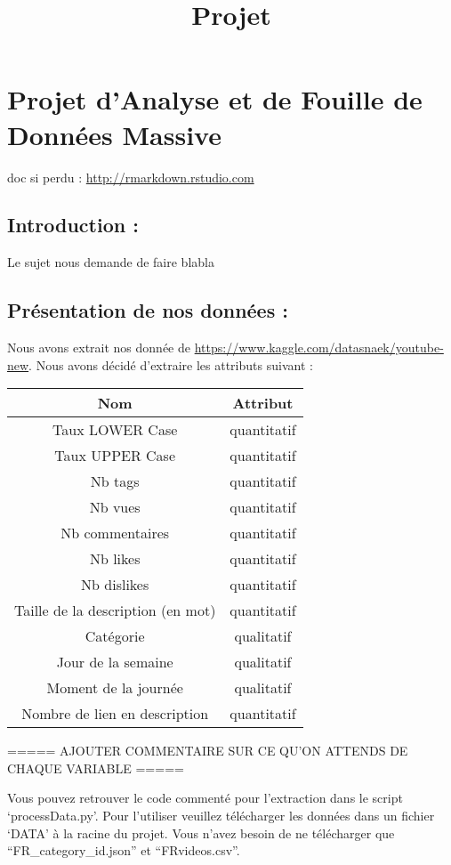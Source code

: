 \documentclass[
]{article}
\title{Projet}
\author{}
\date{\vspace{-2.5em}}
\begin{document}
\maketitle

\hypertarget{projet-danalyse-et-de-fouille-de-donnuxe9es-massive}{%
\section{Projet d'Analyse et de Fouille de Données
Massive}\label{projet-danalyse-et-de-fouille-de-donnuxe9es-massive}}

doc si perdu : \url{http://rmarkdown.rstudio.com}

\hypertarget{introduction}{%
\subsection{Introduction :}\label{introduction}}

Le sujet nous demande de faire blabla

\hypertarget{pruxe9sentation-de-nos-donnuxe9es}{%
\subsection{Présentation de nos données
:}\label{pruxe9sentation-de-nos-donnuxe9es}}

Nous avons extrait nos donnée de
\url{https://www.kaggle.com/datasnaek/youtube-new}. Nous avons décidé
d'extraire les attributs suivant :

\begin{longtable}[]{@{}cc@{}}
\toprule
Nom & Attribut\tabularnewline
\midrule
\endhead
Taux LOWER Case & quantitatif\tabularnewline
Taux UPPER Case & quantitatif\tabularnewline
Nb tags & quantitatif\tabularnewline
Nb vues & quantitatif\tabularnewline
Nb commentaires & quantitatif\tabularnewline
Nb likes & quantitatif\tabularnewline
Nb dislikes & quantitatif\tabularnewline
Taille de la description (en mot) & quantitatif\tabularnewline
Catégorie & qualitatif\tabularnewline
Jour de la semaine & qualitatif\tabularnewline
Moment de la journée & qualitatif\tabularnewline
Nombre de lien en description & quantitatif\tabularnewline
\bottomrule
\end{longtable}

===== AJOUTER COMMENTAIRE SUR CE QU'ON ATTENDS DE CHAQUE VARIABLE =====

Vous pouvez retrouver le code commenté pour l'extraction dans le script
`processData.py'. Pour l'utiliser veuillez télécharger les données dans
un fichier `DATA' à la racine du projet. Vous n'avez besoin de ne
télécharger que ``FR\_category\_id.json'' et ``FRvideos.csv''.
\end{document}
